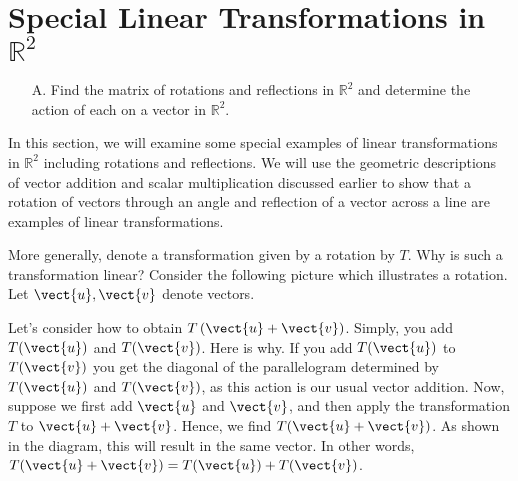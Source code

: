 \section{Special Linear Transformations in $\mathbb{R}^2$}

\begin{outcome}
\begin{enumerate}
\item[A.] Find the matrix of rotations and reflections in $\mathbb{R}^2$ and determine the action of each on a vector in $\mathbb{R}^2$. 
\end{enumerate}
\end{outcome}

In this section, we will examine some special examples of linear transformations in $\mathbb{R}^2$ including rotations and reflections. We will use the geometric descriptions of vector addition and scalar
multiplication discussed earlier to show that a rotation of vectors through an angle and reflection of a vector across a line are examples of
linear transformations. 

More generally, denote a transformation given by a rotation by $T$. Why is such a transformation
linear? Consider the following picture which illustrates a rotation. Let $\vect{u},\vect{v}$ denote vectors. 

\begin{center}
\end{center}

Let's consider how to obtain $T\left( \vect{u}+\vect{v}\right)$. 
Simply, you add $T (\vect{u})$ and $T(\vect{v})$. 
Here is why. If you add $T(\vect{u})$ to $T(\vect{v})$ you get
the diagonal of the parallelogram determined by $T(\vect{u})$ and $T(\vect{v})$, as this action
is our usual vector addition.
Now, suppose we first add $\vect{u}$ and $\vect{v}$, and then apply the transformation $T$ to 
$\vect{u}+\vect{v}$. Hence, we find $T( \vect{u}+\vect{v})$. 
As shown in the diagram, this will result in the same vector. In other words, $T(\vect{u}+\vect{v}) = T(\vect{u}) 
+ T(\vect{v})$. 


